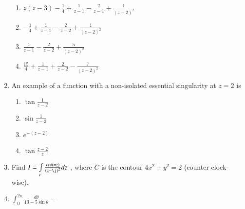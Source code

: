 \documentclass[journal,12pt,twocolumn]{IEEEtran}
\begin{document}
\begin{enumerate}[1.]
\begin{enumerate}

\item $
z(z-3)-\frac{1}{4}+\frac{1}{z-1}-\frac{2}{z-1}+\frac{1}{(z-2)^2}
$

\item $
-\frac{1}{4}+\frac{1}{z-1}-\frac{2}{z-2}+\frac{1}{(z-2)^2}
$

\item $
\frac{1}{z-1}-\frac{2}{z-2}+\frac{5}{(z-2)^2}
$

\item $
\frac{15}{4}+\frac{1}{z-1}+\frac{2}{z-2}-\frac{7}{(z-2)^2}
$

\end{enumerate}

\item An example of a function with a non-isolated essential singularity at $z=2$ is

\begin{enumerate}

\item $
\tan \frac{1}{z-2}
$

\item $
\sin \frac{1}{z-2}
$

\item $
e^{-(z-2)}
$

\item $
\tan \frac{z-2}{z}
$

\end{enumerate}

\item Find $I= \int\limits_{c}\frac{\cot(\pi z)}{(z-\j)^2}dz$ , where $C$ is the contour $4x^2+y^2=2$ (counter clock-wise).
%
%
%
%
%
%

\item $\int_{0}^{2 \pi}\frac{d \theta}{13-5 \sin \theta}= $


%
%
%
%
%



\end{enumerate}
\end{document}
